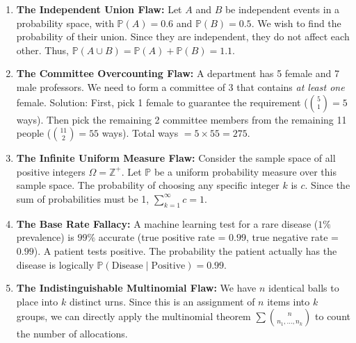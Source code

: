 \documentclass[11pt]{article}
\theoremstyle{definition}
\begin{document}
\begin{enumerate}
    \item \textbf{The Independent Union Flaw:} Let $A$ and $B$ be independent events in a probability space, with $\mathbb{P}(A) = 0.6$ and $\mathbb{P}(B) = 0.5$. We wish to find the probability of their union. Since they are independent, they do not affect each other. Thus, $\mathbb{P}(A \cup B) = \mathbb{P}(A) + \mathbb{P}(B) = 1.1$.
    \item \textbf{The Committee Overcounting Flaw:} A department has 5 female and 7 male professors. We need to form a committee of 3 that contains \textit{at least one} female. Solution: First, pick 1 female to guarantee the requirement ($\binom{5}{1} = 5$ ways). Then pick the remaining 2 committee members from the remaining 11 people ($\binom{11}{2} = 55$ ways). Total ways $= 5 \times 55 = 275$.
    \item \textbf{The Infinite Uniform Measure Flaw:} Consider the sample space of all positive integers $\Omega = \mathbb{Z}^+$. Let $\mathbb{P}$ be a uniform probability measure over this sample space. The probability of choosing any specific integer $k$ is $c$. Since the sum of probabilities must be 1, $\sum_{k=1}^\infty c = 1$.
    \item \textbf{The Base Rate Fallacy:} A machine learning test for a rare disease ($1\%$ prevalence) is $99\%$ accurate (true positive rate = $0.99$, true negative rate = $0.99$). A patient tests positive. The probability the patient actually has the disease is logically $\mathbb{P}(\text{Disease} \mid \text{Positive}) = 0.99$.
    \item \textbf{The Indistinguishable Multinomial Flaw:} We have $n$ identical balls to place into $k$ distinct urns. Since this is an assignment of $n$ items into $k$ groups, we can directly apply the multinomial theorem $\sum \binom{n}{n_1,\dots,n_k}$ to count the number of allocations.
\end{enumerate}
\end{document}
